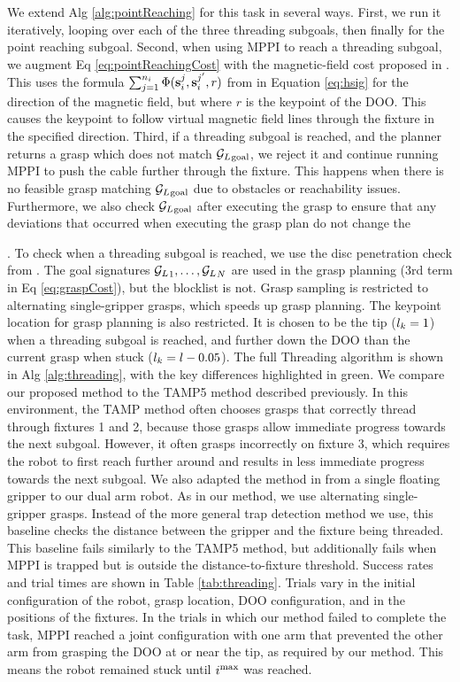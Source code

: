 We extend Alg \ref{alg:pointReaching} for this task in several ways. First, we run it iteratively, looping over each of the three threading subgoals, then finally for the point reaching subgoal. Second, when using MPPI to reach a threading subgoal, we augment Eq \eqref{eq:pointReachingCost} with the magnetic-field cost proposed in \cite{Weifu}. This uses the formula $\sum_{j=1}^{n_i}\Phi(\textbf{s}_i^j,\textbf{s}_i^{j'}, r)$ from in Equation \eqref{eq:hsig} for the direction of the magnetic field, but where $r$ is the keypoint of the DOO. This causes the keypoint to follow virtual magnetic field lines through the fixture in the specified direction. Third, if a threading subgoal is reached, and the planner returns a grasp which does not match ${\mathcal{G}_L}{}_\text{goal}$, we reject it and continue running MPPI to push the cable further through the fixture. This happens when there is no feasible grasp matching ${\mathcal{G}_L}{}_\text{goal}$ due to obstacles or reachability issues. Furthermore, we also check ${\mathcal{G}_L}{}_\text{goal}$ after executing the grasp to ensure that any deviations that occurred when executing the grasp plan do not change the \signature{}. To check when a threading subgoal is reached, we use the disc penetration check from \cite{Weifu}. The goal signatures ${\mathcal{G}_L}_1,\dots,{\mathcal{G}_L}_N$ are used in the grasp planning (3rd term in Eq \eqref{eq:graspCost}), but the blocklist is not. Grasp sampling is restricted to alternating single-gripper grasps, which speeds up grasp planning. The keypoint location for grasp planning is also restricted. It is chosen to be the tip ($l_k=1$) when a threading subgoal is reached, and further down the DOO than the current grasp when stuck ($l_k=l-0.05$). The full Threading algorithm is shown in Alg \ref{alg:threading}, with the key differences highlighted in green.
We compare our proposed method to the TAMP5 method described previously. In this environment, the TAMP method often chooses grasps that correctly thread through fixtures 1 and 2, because those grasps allow immediate progress towards the next subgoal. However, it often grasps incorrectly on fixture 3, which requires the robot to first reach further around and results in less immediate progress towards the next subgoal. We also adapted the method in \cite{Weifu} from a single floating gripper to our dual arm robot. As in our method, we use alternating single-gripper grasps. Instead of the more general trap detection method we use, this baseline checks the distance between the gripper and the fixture being threaded. This baseline fails similarly to the TAMP5 method, but additionally fails when MPPI is trapped but is outside the distance-to-fixture threshold. Success rates and trial times are shown in Table \ref{tab:threading}. Trials vary in the initial configuration of the robot, grasp location, DOO configuration, and in the positions of the fixtures. In the trials in which our method failed to complete the task, MPPI reached a joint configuration with one arm that prevented the other arm from grasping the DOO at or near the tip, as required by our method. This means the robot remained stuck until $i^\text{max}$ was reached.

